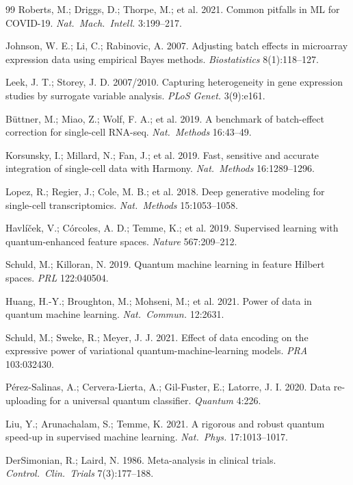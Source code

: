 \documentclass[letterpaper,11pt]{article}
\begin{document}
\begin{thebibliography}{99}
Roberts, M.; Driggs, D.; Thorpe, M.; et al. 2021. Common pitfalls in
 ML for COVID-19. \emph{Nat.\ Mach.\ Intell.} 3:199--217.

Johnson, W. E.; Li, C.; Rabinovic, A. 2007. Adjusting batch effects
 in microarray expression data using empirical Bayes methods.
 \emph{Biostatistics} 8(1):118--127.

Leek, J. T.; Storey, J. D. 2007/2010. Capturing heterogeneity in
 gene expression studies by surrogate variable analysis.
 \emph{PLoS Genet.} 3(9):e161.

B\"uttner, M.; Miao, Z.; Wolf, F. A.; et al. 2019. A benchmark of
 batch-effect correction for single-cell RNA-seq. \emph{Nat.\
 Methods} 16:43--49.

Korsunsky, I.; Millard, N.; Fan, J.; et al. 2019. Fast, sensitive
 and accurate integration of single-cell data with Harmony.
 \emph{Nat.\ Methods} 16:1289--1296.

Lopez, R.; Regier, J.; Cole, M. B.; et al. 2018. Deep generative
 modeling for single-cell transcriptomics. \emph{Nat.\ Methods}
 15:1053--1058.

Havl\'{i}\v{c}ek, V.; C\'orcoles, A. D.; Temme, K.; et al. 2019.
 Supervised learning with quantum-enhanced feature spaces.
 \emph{Nature} 567:209--212.

Schuld, M.; Killoran, N. 2019. Quantum machine learning in feature
 Hilbert spaces. \emph{PRL} 122:040504.

Huang, H.-Y.; Broughton, M.; Mohseni, M.; et al. 2021. Power of data
 in quantum machine learning. \emph{Nat.\ Commun.} 12:2631.

Schuld, M.; Sweke, R.; Meyer, J. J. 2021. Effect of data encoding on
 the expressive power of variational quantum-machine-learning models.
 \emph{PRA} 103:032430.

P\'erez-Salinas, A.; Cervera-Lierta, A.; Gil-Fuster, E.; Latorre, J. I.
 2020. Data re-uploading for a universal quantum classifier.
 \emph{Quantum} 4:226.

Liu, Y.; Arunachalam, S.; Temme, K. 2021. A rigorous and robust
 quantum speed-up in supervised machine learning. \emph{Nat.\ Phys.}
 17:1013--1017.

DerSimonian, R.; Laird, N. 1986. Meta-analysis in clinical trials.
 \emph{Control.\ Clin.\ Trials} 7(3):177--188.


\end{thebibliography}
\end{document}

